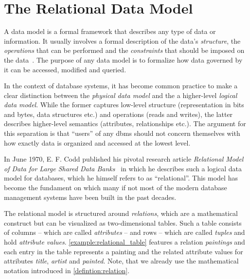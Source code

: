 \section{The Relational Data Model}
\label{section:relational_data_model}

A data model is a formal framework that describes any type of data or information. It usually involves a formal description of the data's \emph{structure}, the \emph{operations} that can be performed and the \emph{constraints} that should be imposed on the data~\cite{Garcia:2009Database}. The purpose of any data model is to formalize how data governed by it can be accessed, modified and queried.

In the context of database systems, it has become common practice to make a clear distinction between the \emph{physical data model} and the a higher-level \emph{logical data model}. While the former captures low-level structure (representation in bits and bytes, data structures etc.) and operations (reads and writes), the latter describes higher-level semantics (attributes, relationships etc.). The argument for this separation is that ``users'' of any \gls{dbms} should not concern themselves with how exactly data is organized and accessed at the lowest level.

In June 1970, E. F. Codd published his pivotal research article \emph{Relational Model of Data for Large Shared Data Banks}~\cite{Codd:1970Relational} in which he describes such a logical data model for databases, which he himself refers to as ``relational''. This model has become the fundament on which many if not most of the modern database management systems have been built in the past decades. 

The relational model is structured around \emph{relations}, which are a mathematical construct but can be visualized as two-dimensional tables. Such a table consists of columns -- which are called \emph{attributes} -- and rows -- which are called \emph{tuples} and hold \emph{attribute values}. \cref{example:relational_table} features a relation \emph{paintings} and each entry in the table represents a painting and the related attribute values for attributes \emph{title}, \emph{artist} and \emph{painted}. Note, that we already use the mathematical notation introduced in \cref{defintion:relation}.

